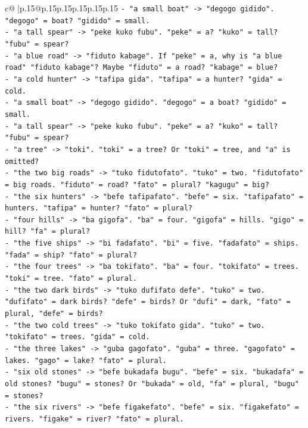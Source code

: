 \documentclass{article}
\begin{document}
{\begin{supertabular}{c@{$\;$}|p{.15\linewidth}@{}p{.15\linewidth}p{.15\linewidth}p{.15\linewidth}p{.15\linewidth}p{.15\linewidth}}
{{{\texttt{{-} "a small boat" {-}> "degogo gidido". "degogo" = boat? "gidido" = small.} \\
\texttt{{-} "a tall spear" {-}> "peke kuko fubu". "peke" = a? "kuko" = tall? "fubu" = spear?} \\
\texttt{{-} "a blue road" {-}> "fiduto kabage". If "peke" = a, why is "a blue road" "fiduto kabage"? Maybe "fiduto" = a road? "kabage" = blue?} \\
\texttt{{-} "a cold hunter" {-}> "tafipa gida". "tafipa" = a hunter? "gida" = cold.} \\
\texttt{{-} "a small boat" {-}> "degogo gidido". "degogo" = a boat? "gidido" = small.} \\
\texttt{{-} "a tall spear" {-}> "peke kuko fubu". "peke" = a? "kuko" = tall? "fubu" = spear?} \\
\texttt{{-} "a tree" {-}> "toki". "toki" = a tree? Or "toki" = tree, and "a" is omitted?} \\
\texttt{{-} "the two big roads" {-}> "tuko fidutofato". "tuko" = two. "fidutofato" = big roads. "fiduto" = road? "fato" = plural? "kagugu" = big?} \\
\texttt{{-} "the six hunters" {-}> "befe tafipafato". "befe" = six. "tafipafato" = hunters. "tafipa" = hunter? "fato" = plural?} \\
\texttt{{-} "four hills" {-}> "ba gigofa". "ba" = four. "gigofa" = hills. "gigo" = hill? "fa" = plural?} \\
\texttt{{-} "the five ships" {-}> "bi fadafato". "bi" = five. "fadafato" = ships. "fada" = ship? "fato" = plural?} \\
\texttt{{-} "the four trees" {-}> "ba tokifato". "ba" = four. "tokifato" = trees. "toki" = tree. "fato" = plural.} \\
\texttt{{-} "the two dark birds" {-}> "tuko dufifato defe". "tuko" = two. "dufifato" = dark birds? "defe" = birds? Or "dufi" = dark, "fato" = plural, "defe" = birds?} \\
\texttt{{-} "the two cold trees" {-}> "tuko tokifato gida". "tuko" = two. "tokifato" = trees. "gida" = cold.} \\
\texttt{{-} "the three lakes" {-}> "guba gagofato". "guba" = three. "gagofato" = lakes. "gago" = lake? "fato" = plural.} \\
\texttt{{-} "six old stones" {-}> "befe bukadafa bugu". "befe" = six. "bukadafa" = old stones? "bugu" = stones? Or "bukada" = old, "fa" = plural, "bugu" = stones?} \\
\texttt{{-} "the six rivers" {-}> "befe figakefato". "befe" = six. "figakefato" = rivers. "figake" = river? "fato" = plural.} \\
}}}
\end{supertabular}}
\end{document}
